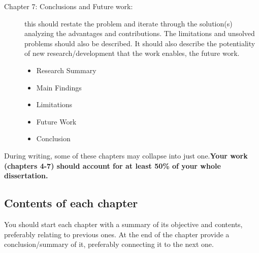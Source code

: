 \begin{description}
\item[Chapter 7: Conclusions and Future work:] 
         this should restate the problem and iterate through the solution(s) analyzing the advantages and contributions. The limitations and unsolved problems should also be described.
         It should also describe the potentiality of new research/development that the work enables, the future work.
   \begin{itemize}
      \item Research Summary
      \item Main Findings
      \item Limitations
      \item Future Work
      \item Conclusion
   \end{itemize}
\end{description}
During writing, some of these chapters may collapse into just one.\textbf{Your work (chapters 4-7) should account for at least 50\% of your whole dissertation.}

\subsection{Contents of each chapter}
You should start each chapter with a summary of its objective and contents, preferably relating to previous ones. At the end of the chapter provide a conclusion/summary of it, preferably connecting it to the next one.

